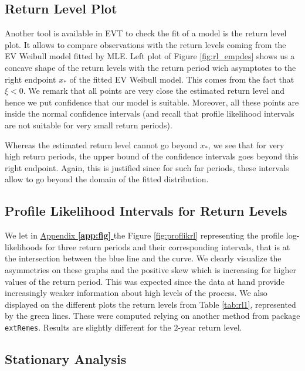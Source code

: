 \subsection*{Return Level Plot}

Another tool is available in EVT to check the fit of a model is the return level plot. It allows to compare
observations with the return levels coming from the EV Weibull model fitted by MLE. Left plot of
Figure \ref{fig:rl_empdes} shows us a concave shape of the return levels with the return period wich asymptotes to the right endpoint $x_*$ of the fitted EV Weibull model. This comes from the fact that $\xi<0$. We remark
that all points are very close the estimated return level and hence we put confidence that our model
is suitable. Moreover, all these points are inside the normal confidence intervals (and recall that profile
likelihood intervals are not suitable for very small return periods).

Whereas the estimated return level cannot go beyond $x_*$, we see that for very high return periods, the upper bound of the confidence intervals goes beyond this right endpoint. Again, this is justified since for such far periods, these intervals allow to go beyond the domain of the fitted distribution.



\subsection*{Profile Likelihood Intervals for Return Levels}

We let in \hyperref[app:fig]{Appendix \textbf{\ref{app:fig} }} the Figure \ref{fig:proflikrl} representing the profile log-likelihoods for three return periods and their corresponding intervals, that is at the intersection between the blue line and the curve. We
clearly visualize the asymmetries on these graphs and the positive skew which is increasing for higher
values of the return period. This was expected since the data at hand provide increasingly weaker
information about high levels of the process. We also displayed on the different plots the return levels
from Table \ref{tab:rl1}, represented by the green lines. These were computed relying on another method from
package \texttt{extRemes}. Results are slightly different for the $2$-year return level.


\subsection{Stationary Analysis}

